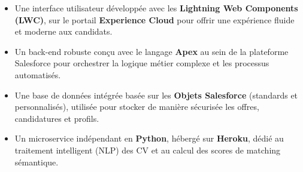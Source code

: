  \begin{itemize}
    \item Une interface utilisateur développée avec les \textbf{Lightning Web Components (LWC)}, sur le portail \textbf{Experience Cloud} pour offrir une expérience fluide et moderne aux candidats.

    \item Un back-end robuste conçu avec le langage \textbf{Apex} au sein de la plateforme Salesforce pour orchestrer la logique métier complexe et les processus automatisés.
    
    \item Une base de données intégrée basée sur les \textbf{Objets Salesforce} (standards et personnalisés), utilisée pour stocker de manière sécurisée les offres, candidatures et profils.

    \item Un microservice indépendant en \textbf{Python}, hébergé sur \textbf{Heroku}, dédié au traitement intelligent (NLP) des CV et au calcul des scores de matching sémantique.
    
\end{itemize}


